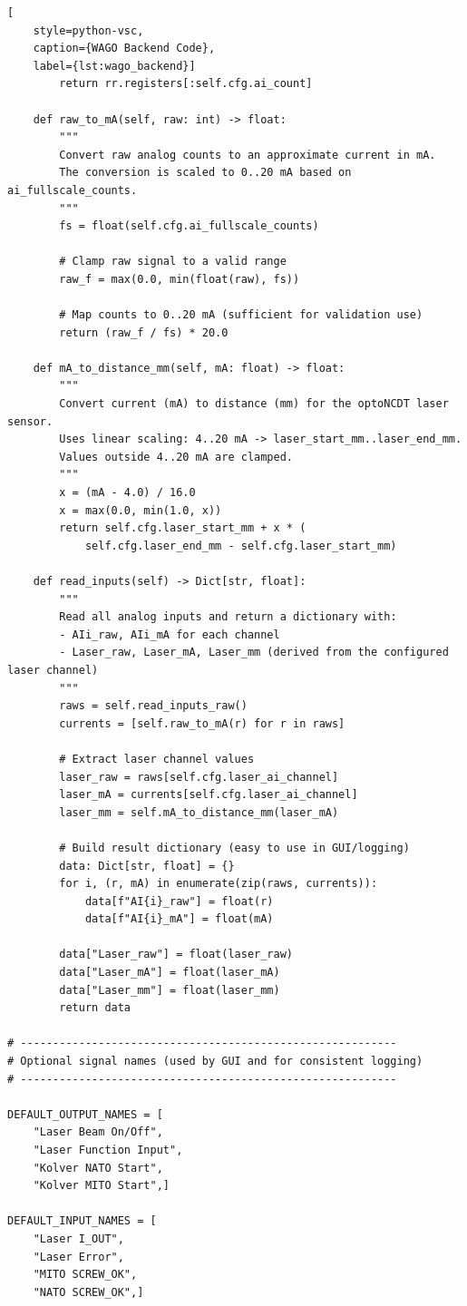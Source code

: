 \begin{lstlisting}[
    style=python-vsc,
    caption={WAGO Backend Code},
    label={lst:wago_backend}]
        return rr.registers[:self.cfg.ai_count]

    def raw_to_mA(self, raw: int) -> float:
        """
        Convert raw analog counts to an approximate current in mA.
        The conversion is scaled to 0..20 mA based on ai_fullscale_counts.
        """
        fs = float(self.cfg.ai_fullscale_counts)

        # Clamp raw signal to a valid range
        raw_f = max(0.0, min(float(raw), fs))

        # Map counts to 0..20 mA (sufficient for validation use)
        return (raw_f / fs) * 20.0

    def mA_to_distance_mm(self, mA: float) -> float:
        """
        Convert current (mA) to distance (mm) for the optoNCDT laser sensor.
        Uses linear scaling: 4..20 mA -> laser_start_mm..laser_end_mm.
        Values outside 4..20 mA are clamped.
        """
        x = (mA - 4.0) / 16.0
        x = max(0.0, min(1.0, x))
        return self.cfg.laser_start_mm + x * (
            self.cfg.laser_end_mm - self.cfg.laser_start_mm)

    def read_inputs(self) -> Dict[str, float]:
        """
        Read all analog inputs and return a dictionary with:
        - AIi_raw, AIi_mA for each channel
        - Laser_raw, Laser_mA, Laser_mm (derived from the configured laser channel)
        """
        raws = self.read_inputs_raw()
        currents = [self.raw_to_mA(r) for r in raws]

        # Extract laser channel values
        laser_raw = raws[self.cfg.laser_ai_channel]
        laser_mA = currents[self.cfg.laser_ai_channel]
        laser_mm = self.mA_to_distance_mm(laser_mA)

        # Build result dictionary (easy to use in GUI/logging)
        data: Dict[str, float] = {}
        for i, (r, mA) in enumerate(zip(raws, currents)):
            data[f"AI{i}_raw"] = float(r)
            data[f"AI{i}_mA"] = float(mA)

        data["Laser_raw"] = float(laser_raw)
        data["Laser_mA"] = float(laser_mA)
        data["Laser_mm"] = float(laser_mm)
        return data

# ----------------------------------------------------------
# Optional signal names (used by GUI and for consistent logging)
# ----------------------------------------------------------

DEFAULT_OUTPUT_NAMES = [
    "Laser Beam On/Off",
    "Laser Function Input",
    "Kolver NATO Start",
    "Kolver MITO Start",]

DEFAULT_INPUT_NAMES = [
    "Laser I_OUT",
    "Laser Error",
    "MITO SCREW_OK",
    "NATO SCREW_OK",]

\end{lstlisting}

